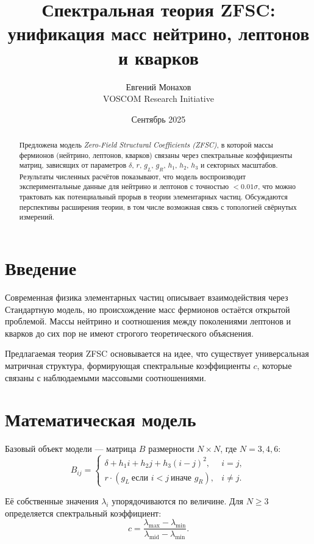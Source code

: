 \documentclass[12pt,a4paper]{article}
\title{Спектральная теория ZFSC: \\ 
унификация масс нейтрино, лептонов и кварков}
\author{Евгений Монахов \\ VOSCOM Research Initiative}
\date{Сентябрь 2025}
\begin{document}
\maketitle

\begin{abstract}
Предложена модель \emph{Zero-Field Structural Coefficients (ZFSC)}, 
в которой массы фермионов (нейтрино, лептонов, кварков) 
связаны через спектральные коэффициенты матриц, зависящих от параметров 
$\delta$, $r$, $g_L$, $g_R$, $h_1$, $h_2$, $h_3$ и секторных масштабов.  
Результаты численных расчётов показывают, что модель воспроизводит 
экспериментальные данные для нейтрино и лептонов с точностью $<0.01\sigma$, 
что можно трактовать как потенциальный прорыв в теории элементарных частиц.  
Обсуждаются перспективы расширения теории, в том числе возможная связь 
с топологией свёрнутых измерений.  
\end{abstract}

\section{Введение}
Современная физика элементарных частиц описывает взаимодействия через 
Стандартную модель, но происхождение масс фермионов остаётся открытой проблемой.  
Массы нейтрино и соотношения между поколениями лептонов и кварков 
до сих пор не имеют строгого теоретического объяснения.  

Предлагаемая теория ZFSC основывается на идее, что существует 
универсальная матричная структура, формирующая спектральные коэффициенты $c$, 
которые связаны с наблюдаемыми массовыми соотношениями.  

\section{Математическая модель}
Базовый объект модели — матрица $B$ размерности $N\times N$, где $N=3,4,6$:
\begin{equation}
B_{ij} =
\begin{cases}
\delta + h_1 i + h_2 j + h_3 (i-j)^2, & i=j, \\
r \cdot (g_L \ \text{если } i<j \ \text{иначе } g_R), & i \neq j.
\end{cases}
\end{equation}

Её собственные значения $\lambda_i$ упорядочиваются по величине.  
Для $N \geq 3$ определяется спектральный коэффициент:
\begin{equation}
c = \frac{\lambda_{\max} - \lambda_{\min}}{\lambda_{\text{mid}} - \lambda_{\min}}.
\end{equation}
\end{document}
